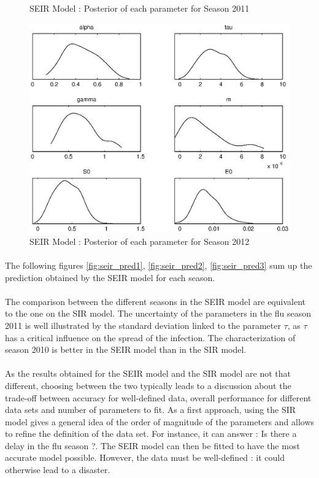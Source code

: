 \documentclass[11pt, a4paper]{article}
\begin{document}
\begin{figure}[H!]
    \caption{SEIR Model : Posterior of each parameter for Season 2011}
    \label{fig:seir_post2}
    \includegraphics[height = 0.25\textheight]{figures/SEIR_posterior_season3.eps}
    \caption{SEIR Model : Posterior of each parameter for Season 2012}
    \label{fig:seir_post3}
\end{figure}


\paragraph{}
The following figures \ref{fig:seir_pred1}, \ref{fig:seir_pred2}, \ref{fig:seir_pred3} sum up the prediction obtained by the SEIR model for each season.

\paragraph{}
The comparison between the different seasons in the SEIR model are equivalent to the one on the SIR model. The uncertainty of the parameters in the flu season 2011 is well illustrated by the standard deviation linked to the parameter $\tau$, as $\tau$ has a critical influence on the spread of the infection. The characterization of season 2010 is better in the SEIR model than in the SIR model.

\paragraph{}
As the results obtained for the SEIR model and the SIR model are not that different, choosing between the two typically leads to a discussion about the trade-off between accuracy for well-defined data, overall performance for different data sets and number of parameters to fit. As a first approach, using the SIR model gives a general idea of the order of magnitude of the parameters and allows to refine the definition of the data set. For instance, it can answer : Is there a delay in the flu season ?. The SEIR model can then be fitted to have the most accurate model possible. However, the data must be well-defined : it could otherwise lead to a disaster.
\end{document}
